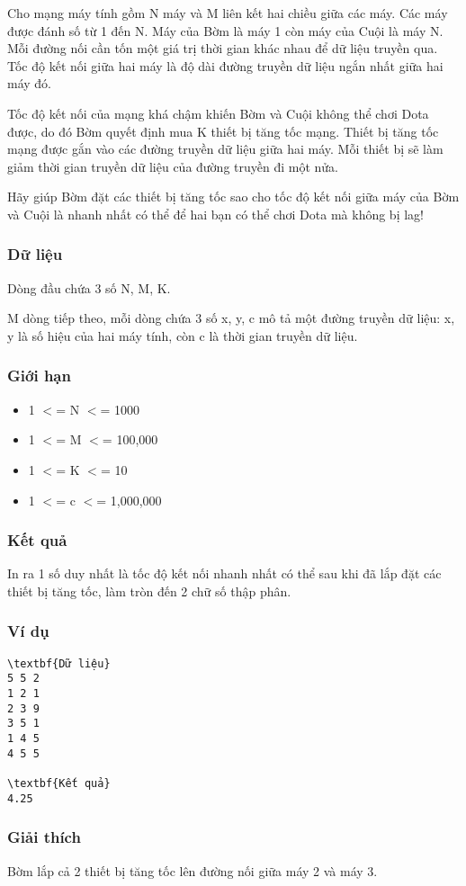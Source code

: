



   Cho mạng máy tính gồm N máy và M liên kết hai chiều giữa các máy. Các máy được đánh số từ 1 đến N. Máy của Bờm là máy 1 còn máy của Cuội là máy N. Mỗi đường nối cần tốn một giá trị thời gian khác nhau để dữ liệu truyền qua. Tốc độ kết nối giữa hai máy là độ dài đường truyền dữ liệu ngắn nhất giữa hai máy đó.  

   Tốc độ kết nối của mạng khá chậm khiến Bờm và Cuội không thể chơi Dota được, do đó Bờm quyết định mua K thiết bị tăng tốc mạng. Thiết bị tăng tốc mạng được gắn vào các đường truyền dữ liệu giữa hai máy. Mỗi thiết bị sẽ làm giảm thời gian truyền dữ liệu của đường truyền đi một nửa.  

   Hãy giúp Bờm đặt các thiết bị tăng tốc sao cho tốc độ kết nối giữa máy của Bờm và Cuội là nhanh nhất có thể để hai bạn có thể chơi Dota mà không bị lag!  

\subsubsection{   Dữ liệu  }

   Dòng đầu chứa 3 số N, M, K.  

   M dòng tiếp theo, mỗi dòng chứa 3 số x, y, c mô tả một đường truyền dữ liệu: x, y là số hiệu của hai máy tính, còn c là thời gian truyền dữ liệu.  

\subsubsection{   Giới hạn  }
\begin{itemize}
	\item     1 $<$= N $<$= 1000   
	\item     1 $<$= M $<$= 100,000   
	\item     1 $<$= K $<$= 10   
	\item     1 $<$= c $<$= 1,000,000   
\end{itemize}

\subsubsection{   Kết quả  }

   In ra 1 số duy nhất là tốc độ kết nối nhanh nhất có thể sau khi đã lắp đặt các thiết bị tăng tốc, làm tròn đến 2 chữ số thập phân.  

\subsubsection{   Ví dụ  }
\begin{verbatim}
\textbf{Dữ liệu}
5 5 2
1 2 1
2 3 9
3 5 1
1 4 5
4 5 5

\textbf{Kết quả}
4.25
\end{verbatim}

\subsubsection{   Giải thích  }

   Bờm lắp cả 2 thiết bị tăng tốc lên đường nối giữa máy 2 và máy 3.  